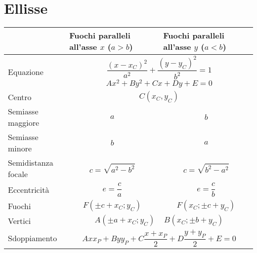 \documentclass{article}
\begin{document}
\section*{Ellisse}
    \begin{table}[h]
    \centering
    \begin{tabular}{|m{}|m{}|m{}|}
        \hline
        & Fuochi paralleli all'asse $x$ ($a>b$) & Fuochi paralleli all'asse $y$ ($a<b$)\\ \hline\hline
        Equazione & \multicolumn{2}{m{0.74\textwidth}|}{\[\frac{(x-x_C)^2}{a^2}+\frac{(y-y_C)^2}{b^2}=1\] \[Ax^2+By^2+Cx+Dy+E=0\]}\\ \hline
        Centro & \multicolumn{2}{m{0.74\textwidth}|}{\[C\left(x_C,y_C\right)\]}\\\hline
        Semiasse maggiore & \[a\] & \[b\]\\\hline
        Semiasse minore & \[b\] & \[a\]\\\hline
        Semidistanza focale & \[c=\sqrt{a^2-b^2}\] & \[c=\sqrt{b^2-a^2}\]\\ \hline
        Eccentricità & \[e=\frac{c}{a}\] & \[e=\frac{c}{b}\] \\ \hline
        Fuochi &\[F\left(\pm c+x_C;y_C\right)\] & \[F\left(x_C;\pm c + y_C\right)\]\\\hline
        Vertici & \multicolumn{2}{m{0.74\textwidth}|}{\[A\left(\pm a + x_C;y_C\right) ~~~~~B\left(x_C;\pm b +y_C\right)\]}\\\hline
        Sdoppiamento & \multicolumn{2}{m{0.74\textwidth}|}{\[Axx_P+Byy_P+C\frac{x+x_P}{2}+D\frac{y+y_P}{2}+E=0\]} \\ \hline
    \end{tabular}
\end{table}
\newpage
\end{document}
